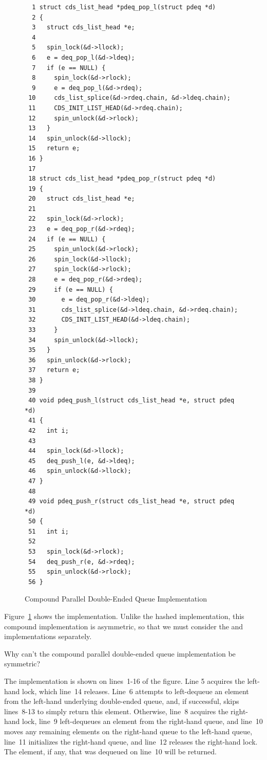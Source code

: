 \begin{figure}[bp]
{ \scriptsize
\begin{verbatim}
  1 struct cds_list_head *pdeq_pop_l(struct pdeq *d)
  2 {
  3   struct cds_list_head *e;
  4 
  5   spin_lock(&d->llock);
  6   e = deq_pop_l(&d->ldeq);
  7   if (e == NULL) {
  8     spin_lock(&d->rlock);
  9     e = deq_pop_l(&d->rdeq);
 10     cds_list_splice(&d->rdeq.chain, &d->ldeq.chain);
 11     CDS_INIT_LIST_HEAD(&d->rdeq.chain);
 12     spin_unlock(&d->rlock);
 13   }
 14   spin_unlock(&d->llock);
 15   return e;
 16 }
 17 
 18 struct cds_list_head *pdeq_pop_r(struct pdeq *d)
 19 {
 20   struct cds_list_head *e;
 21 
 22   spin_lock(&d->rlock);
 23   e = deq_pop_r(&d->rdeq);
 24   if (e == NULL) {
 25     spin_unlock(&d->rlock);
 26     spin_lock(&d->llock);
 27     spin_lock(&d->rlock);
 28     e = deq_pop_r(&d->rdeq);
 29     if (e == NULL) {
 30       e = deq_pop_r(&d->ldeq);
 31       cds_list_splice(&d->ldeq.chain, &d->rdeq.chain);
 32       CDS_INIT_LIST_HEAD(&d->ldeq.chain);
 33     }
 34     spin_unlock(&d->llock);
 35   }
 36   spin_unlock(&d->rlock);
 37   return e;
 38 }
 39 
 40 void pdeq_push_l(struct cds_list_head *e, struct pdeq *d)
 41 {
 42   int i;
 43 
 44   spin_lock(&d->llock);
 45   deq_push_l(e, &d->ldeq);
 46   spin_unlock(&d->llock);
 47 }
 48 
 49 void pdeq_push_r(struct cds_list_head *e, struct pdeq *d)
 50 {
 51   int i;
 52 
 53   spin_lock(&d->rlock);
 54   deq_push_r(e, &d->rdeq);
 55   spin_unlock(&d->rlock);
 56 }
\end{verbatim}
}
\caption{Compound Parallel Double-Ended Queue Implementation}
\label{fig:SMPdesign:Compound Parallel Double-Ended Queue Implementation}
\end{figure}

Figure~\ref{fig:SMPdesign:Compound Parallel Double-Ended Queue Implementation}
shows the implementation.
Unlike the hashed implementation, this compound implementation is
asymmetric, so that we must consider the 
and  implementations separately.

\QuickQuiz{}
	Why can't the compound parallel double-ended queue
	implementation be symmetric?
 \QuickQuizEnd

The  implementation is shown on lines~1-16
of the figure.
Line 5 acquires the left-hand lock, which line~14 releases.
Line~6 attempts to left-dequeue an element from the left-hand underlying
double-ended queue, and, if successful, skips lines~8-13 to simply
return this element.
Otherwise, line~8 acquires the right-hand lock, line~9
left-dequeues an element from the right-hand queue,
and line~10 moves any remaining elements on the right-hand
queue to the left-hand queue, line~11 initializes the right-hand queue,
and line~12 releases the right-hand lock.
The element, if any, that was dequeued on line~10 will be returned.

